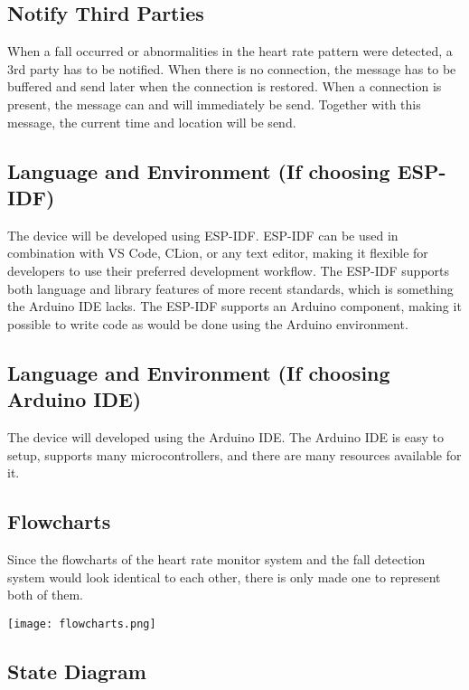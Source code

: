 \documentclass{article}
\begin{document}
\subsection{Notify Third Parties}

When a fall occurred or abnormalities in the heart rate pattern were detected, a 3rd party has to be notified.
When there is no connection, the message has to be buffered and send later when the connection is restored.
When a connection is present, the message can and will immediately be send.
Together with this message, the current time and location will be send.

\subsection*{Language and Environment (If choosing ESP-IDF)}

The device will be developed using ESP-IDF.
ESP-IDF can be used in combination with VS Code, CLion, or any text editor, making it flexible for developers to use their preferred development workflow.
The ESP-IDF supports both language and library features of more recent \cpp{} standards, which is something the Arduino IDE lacks.
The ESP-IDF supports an Arduino component, making it possible to write code as would be done using the Arduino environment.

\subsection*{Language and Environment (If choosing Arduino IDE)}

The device will developed using the Arduino IDE.
The Arduino IDE is easy to setup, supports many microcontrollers, and there are many resources available for it.

\subsection{Flowcharts}

Since the flowcharts of the heart rate monitor system and the fall detection system would look identical to each other, there is only made one to represent both of them.

\texttt{[image: flowcharts.png]}

\subsection{State Diagram}
\end{document}
